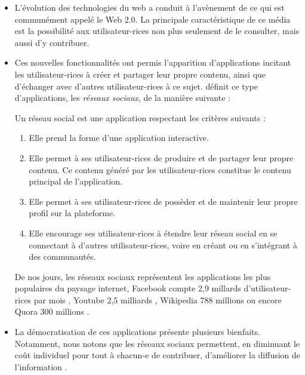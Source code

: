 \begin{itemize}
    \item L'évolution des technologies du web a conduit à l'avènement de ce qui est communément appelé le Web 2.0.
      La principale caractéristique de ce média est la possibilité aux utilisateur-rices non plus seulement de le consulter, mais aussi d'y contribuer.
    \item Ces nouvelles fonctionnalités ont permis l'apparition d'applications incitant les utilisateur-rices à créer et partager leur propre contenu, ainsi que d'échanger avec d'autres utilisateur-rices à ce sujet.
      \cite{2015-social-media-definition-obar} définit ce type d'applications, \ie les \emph{réseaux sociaux}, de la manière suivante :
      \begin{definition}
        Un réseau social est une application respectant les critères suivants :
        \begin{enumerate}
          \item Elle prend la forme d'une application interactive.
          \item Elle permet à ses utilisateur-rices de produire et de partager leur propre contenu.
            Ce contenu généré par les utilisateur-rices constitue le contenu principal de l'application.
          \item Elle permet à ses utilisateur-rices de possèder et de maintenir leur propre profil sur la plateforme.
          \item Elle encourage ses utilisateur-rices à étendre leur réseau social en se connectant à d'autres utilisateur-rices, voire en créant ou en s'intégrant à des communautés.
        \end{enumerate}
      \end{definition}
      De nos jours, les réseaux sociaux représentent les applications les plus populaires du paysage internet, \eg Facebook compte 2,9 millards d'utilisateur-rices par mois \cite{2022-01-monthly-active-users-social-networks}, Youtube 2,5 milliards \cite{2022-01-monthly-active-users-social-networks}, Wikipedia 788 millions {\cite{2022-09-monthly-active-users-wikipedia}} ou encore Quora 300 millions \cite{2022-01-monthly-active-users-social-networks}.
    \item La démocratisation de ces applications présente plusieurs bienfaits.
      Notamment, nous notons que les réseaux sociaux permettent, en diminuant le coût individuel pour tout à chacun-e de contribuer, d'améliorer la diffusion de l'information \cite{2012-youtube-social-movements-meek,2013-wealth-occupation-networks-theocharis}.

\end{itemize}
